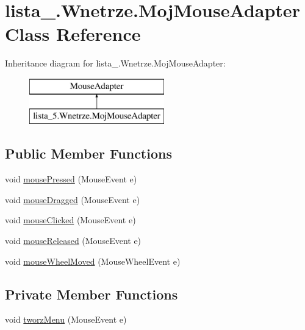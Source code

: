 \hypertarget{classlista__5_1_1_wnetrze_1_1_moj_mouse_adapter}{}\section{lista\+\_.\+Wnetrze.\+Moj\+Mouse\+Adapter Class Reference}
\label{classlista__5_1_1_wnetrze_1_1_moj_mouse_adapter}
Inheritance diagram for lista\+\_.\+Wnetrze.\+Moj\+Mouse\+Adapter\+:\begin{figure}[H]
\begin{center}
\leavevmode
\includegraphics[height=2.000000cm]{classlista__5_1_1_wnetrze_1_1_moj_mouse_adapter}
\end{center}
\end{figure}
\subsection*{Public Member Functions}
\begin{DoxyCompactItemize}
\item 
void \mbox{\hyperlink{classlista__5_1_1_wnetrze_1_1_moj_mouse_adapter_a4ef4404b4f86ad51e68805d24d8c77b2}{mouse\+Pressed}} (Mouse\+Event e)
\item 
void \mbox{\hyperlink{classlista__5_1_1_wnetrze_1_1_moj_mouse_adapter_a37c0d26aa18789ec52ba5acc80251de4}{mouse\+Dragged}} (Mouse\+Event e)
\item 
void \mbox{\hyperlink{classlista__5_1_1_wnetrze_1_1_moj_mouse_adapter_a1835ceb6a8d4d0519e1473ae586f73cc}{mouse\+Clicked}} (Mouse\+Event e)
\item 
void \mbox{\hyperlink{classlista__5_1_1_wnetrze_1_1_moj_mouse_adapter_a782d984136df2ccfa45c7968931b6eff}{mouse\+Released}} (Mouse\+Event e)
\item 
void \mbox{\hyperlink{classlista__5_1_1_wnetrze_1_1_moj_mouse_adapter_a49b07d26c2eb16d94ec11104f9d60779}{mouse\+Wheel\+Moved}} (Mouse\+Wheel\+Event e)
\end{DoxyCompactItemize}
\subsection*{Private Member Functions}
\begin{DoxyCompactItemize}
\item 
void \mbox{\hyperlink{classlista__5_1_1_wnetrze_1_1_moj_mouse_adapter_acaa74559dde8d1028b6cee91e91d5d20}{tworz\+Menu}} (Mouse\+Event e)
\end{DoxyCompactItemize}
